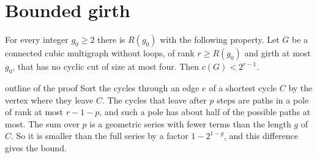 \section{Bounded girth}\label{sec:girth}

\begin{theorem}\label{thm:girth}
For every integer $g_0\ge2$ there is $R(g_0)$ with the following property. Let $G$ be a connected
cubic multigraph without loops, of rank $r\ge R(g_0)$ and girth at most $g_0$, that has no cyclic
cut of size at most four. Then $c(G)<2^{r-1}$.
\end{theorem}

\begin{idea}{outline of the proof}
Sort the cycles through an edge $e$ of a shortest cycle $C$ by the vertex where they leave $C$.
The cycles that leave after $p$ steps are paths in a pole of rank at most $r-1-p$, and such a
pole has about half of the possible paths at most. The sum over $p$ is a geometric series with
fewer terms than the length $g$ of $C$. So it is smaller than the full series by a factor
$1-2^{1-g}$, and this difference gives the bound.
\end{idea}

